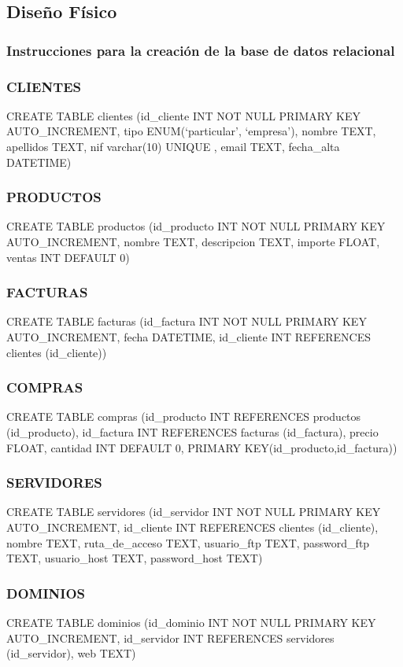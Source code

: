 \documentclass[paper=a4, fontsize=11pt, spanish]{scrartcl}
\begin{document}
\subsection{Diseño Físico}
\subsubsection{Instrucciones para la creación de la base de datos relacional}
\subsubsection *{CLIENTES}
CREATE TABLE clientes (id\_cliente INT NOT NULL PRIMARY KEY AUTO\_INCREMENT, tipo ENUM(‘particular’, ‘empresa’),  nombre TEXT,  apellidos TEXT, nif varchar(10) UNIQUE , email TEXT, fecha\_alta DATETIME)

\subsubsection *{PRODUCTOS}
CREATE TABLE productos (id\_producto INT NOT NULL PRIMARY KEY AUTO\_INCREMENT, nombre TEXT,  descripcion TEXT,  importe FLOAT, ventas INT DEFAULT 0)

\subsubsection *{FACTURAS}
CREATE TABLE facturas (id\_factura INT NOT NULL PRIMARY KEY AUTO\_INCREMENT, fecha DATETIME, id\_cliente INT REFERENCES clientes (id\_cliente))

\subsubsection *{COMPRAS}
CREATE TABLE compras (id\_producto INT REFERENCES productos (id\_producto), id\_factura INT REFERENCES facturas (id\_factura), precio FLOAT, cantidad INT DEFAULT 0, PRIMARY KEY(id\_producto,id\_factura))

\subsubsection *{SERVIDORES}
CREATE TABLE servidores (id\_servidor INT NOT NULL PRIMARY KEY AUTO\_INCREMENT, id\_cliente INT REFERENCES clientes (id\_cliente), nombre TEXT,  ruta\_de\_acceso TEXT, usuario\_ftp TEXT, password\_ftp TEXT, usuario\_host TEXT, password\_host TEXT)

\subsubsection *{DOMINIOS}
CREATE TABLE dominios (id\_dominio INT NOT NULL PRIMARY KEY AUTO\_INCREMENT, id\_servidor INT REFERENCES servidores (id\_servidor), web TEXT)
\end{document}
